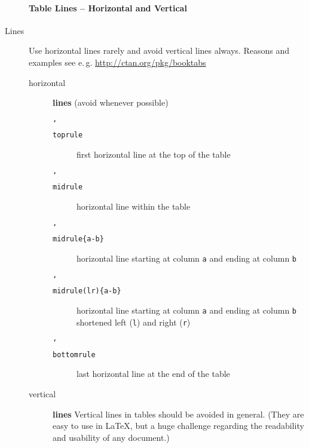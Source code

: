 \documentclass{pharmrep}
\DeclareRobustCommand\cs[1]{\texttt{\char`\\#1}}
\newcommand{\eg}{e.\,g.\xspace}
\begin{document}
\begin{description}
   \paragraph{Table Lines -- Horizontal and Vertical}
   \item[Lines] Use horizontal lines rarely and avoid vertical lines always. Reasons and examples see \eg
   \href{http://ctan.org/pkg/booktabs}{http://ctan.org/pkg/booktabs}
   \begin{description}
      \item[horizontal] \textbf{lines} (avoid whenever possible)
      \begin{description}
         \item[\cs{toprule}] first horizontal line at the top of the table
         \item[\cs{midrule}] horizontal line within the table
         \item[\cs{midrule\{a-b\}}] horizontal line starting at column \texttt{a}
         and ending at column \texttt{b}
         \item[\cs{midrule(lr)\{a-b\}}] horizontal line starting at column \texttt{a}
         and
         ending at column \texttt{b} shortened left (\texttt{l}) and right (\texttt{r})
         \item[\cs{bottomrule}] last horizontal line at the end of the table
      \end{description}
      \item[vertical] \textbf{lines} Vertical lines in tables should be avoided in general. (They are easy
      to use in \LaTeX, but a huge challenge regarding the readability and usability of any document.)
   \end{description}%
\end{description}%

\newpage
\end{document}
